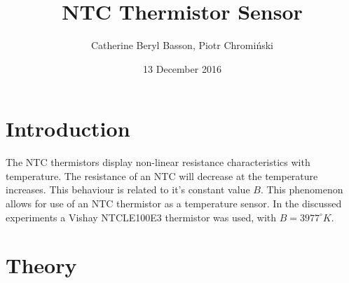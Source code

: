 \documentclass[a4,11pt]{article}
\begin{document}
\title{NTC Thermistor Sensor}
\author{Catherine Beryl Basson, Piotr Chromi\'nski}
\date{13 December 2016}
\maketitle
\twocolumn
\section{Introduction}

The NTC thermistors display non-linear resistance characteristics with temperature. The resistance of an NTC will decrease at the temperature increases. This behaviour is related to it's constant value $B$. This phenomenon allows for use of an NTC thermistor as a temperature sensor. In the discussed experiments a Vishay NTCLE100E3 thermistor was used, with $B=3977^{\circ}K$.

\section{Theory}
\end{document}
